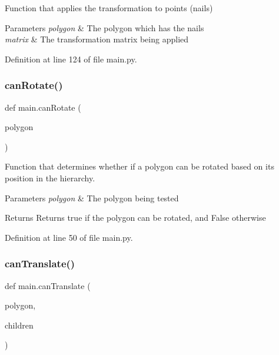Function that applies the transformation to points (nails) 


\begin{DoxyParams}{Parameters}
{\em polygon} & The polygon which has the nails \\
\hline
{\em matrix} & The transformation matrix being applied \\
\hline
\end{DoxyParams}


Definition at line 124 of file main.\+py.

\mbox{\label{namespacemain_ae1d466859928a06baa89a7b9279f4fa1}} 
\subsubsection{\texorpdfstring{can\+Rotate()}{canRotate()}}
{\footnotesize\ttfamily def main.\+can\+Rotate (\begin{DoxyParamCaption}\item[{}]{polygon }\end{DoxyParamCaption})}



Function that determines whether if a polygon can be rotated based on its position in the hierarchy. 


\begin{DoxyParams}{Parameters}
{\em polygon} & The polygon being tested \\
\hline
\end{DoxyParams}
\begin{DoxyReturn}{Returns}
Returns true if the polygon can be rotated, and False otherwise 
\end{DoxyReturn}


Definition at line 50 of file main.\+py.

\mbox{\label{namespacemain_a88fcd4aa7193703d53a8095e78a40fe9}} 
\subsubsection{\texorpdfstring{can\+Translate()}{canTranslate()}}
{\footnotesize\ttfamily def main.\+can\+Translate (\begin{DoxyParamCaption}\item[{}]{polygon,  }\item[{}]{children }\end{DoxyParamCaption})}



